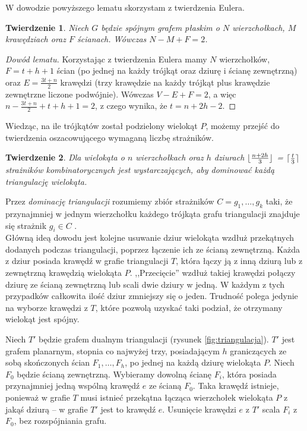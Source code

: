 \documentclass[brudnopis]{xmgr}
\DeclarePairedDelimiter\ceil{\lceil}{\rceil}
\DeclarePairedDelimiter\floor{\lfloor}{\rfloor}
\newtheorem{Twierdzenie}{Twierdzenie}
\theoremstyle{definition}
\begin{document}
W dowodzie powyższego lematu skorzystam z twierdzenia Eulera.
\begin{Twierdzenie} \label{tw eulera} \cite{euler}
  Niech $G$ będzie spójnym grafem płaskim o $N$ wierzchołkach, $M$ krawędziach oraz $F$ ścianach. Wówczas $N - M + F = 2$.
\end{Twierdzenie}

\begin{proof}[Dowód lematu]
	Korzystając z twierdzenia Eulera mamy $N$ wierzchołków, $F = t + h + 1$ ścian (po jednej na każdy trójkąt oraz dziurę i ścianę zewnętrzną) oraz $E = \frac{3t+n}{2}$ krawędzi (trzy krawędzie na każdy trójkąt plus krawędzie zewnętrzne liczone podwójnie).  Wówczas $V - E + F = 2$, a więc $n - \frac{3t+n}{2} + t + h + 1 = 2$, z czego wynika, że $t = n + 2h - 2$.
\end{proof}
Wiedząc, na ile trójkątów został podzielony wielokąt $P$, możemy przejść do twierdzenia oszacowującego wymaganą liczbę strażników.

\begin{Twierdzenie} \cite{orourke} \label{dominacjatriangulacji}
  Dla wielokąta o $n$ wierzchołkach oraz $h$ dziurach $\floor{\frac{n+2h}{3}}$ = $\ceil{\frac{t}{3}}$ strażników kombinatorycznych jest wystarczających, aby dominować każdą triangulację wielokąta.
\end{Twierdzenie}

Przez \emph{dominację triangulacji} rozumiemy zbiór strażników $C = {g_1,\ldots,g_k}$ taki, że przynajmniej w jednym wierzchołku każdego trójkąta grafu triangulacji znajduje się strażnik $g_i \in C$ \cite{orourke}. 
\\\indent Główną ideą dowodu jest kolejne usuwanie dziur wielokąta wzdłuż przekątnych dodanych podczas triangulacji, poprzez łączenie ich ze ścianą zewnętrzną. Każda z dziur posiada krawędź w grafie triangulacji $T$, która łączy ją z inną dziurą lub z zewnętrzną krawędzią wielokąta $P$. ,,Przecięcie'' wzdłuż takiej krawędzi połączy dziurę ze ścianą zewnętrzną lub scali dwie dziury w jedną. W każdym z tych przypadków całkowita ilość dziur zmniejszy się o jeden. Trudność polega jedynie na wyborze krawędzi z $T$, które pozwolą uzyskać taki podział, że otrzymany wielokąt jest spójny.

\indent Niech $T'$ będzie grafem dualnym triangulacji (rysunek \ref{fig:triangulacja}). $T'$ jest grafem planarnym, stopnia co najwyżej trzy, posiadającym $h$ graniczących ze sobą skończonych ścian $F_1, \ldots, F_h$, po jednej na każdą dziurę wielokąta $P$. Niech $F_0$ będzie ścianą zewnętrzną. Wybieramy dowolną ścianę $F_i$, która posiada przynajmniej jedną wspólną krawędź $e$ ze ścianą $F_0$. Taka krawędź istnieje, ponieważ w grafie $T$ musi istnieć przekątna łącząca wierzchołek wielokąta $P$ z jakąś dziurą -- w grafie $T'$ jest to krawędź $e$. Usunięcie krawędzi $e$ z $T'$ scala $F_i$ z $F_0$, bez rozspójniania grafu.
\end{document}
